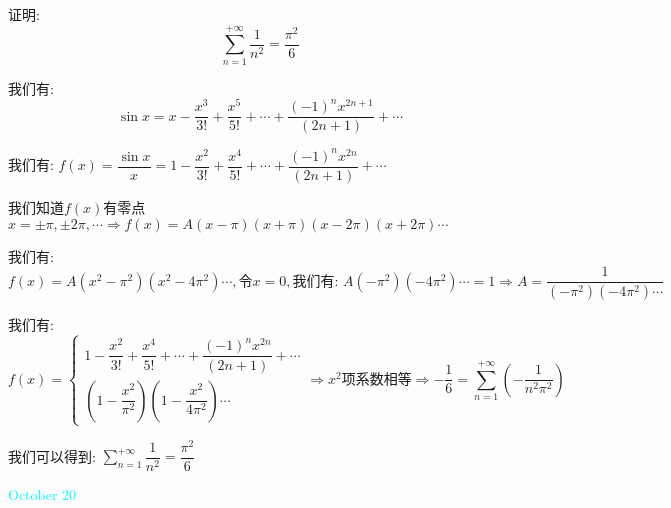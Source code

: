 \begin{example}[][Exam: 36.3.10]
	证明: $$\sum\limits_{n=1}^{+\infty}\dfrac{1}{n^2}=\dfrac{\pi^2}{6}$$
\end{example}

\begin{solution}

	我们有:  
	$$\sin x=x-\dfrac{x^3}{3!}+\dfrac{x^5}{5!}+\cdots+\dfrac{(-1)^{n}x^{2n+1}}{(2n+1)}+\cdots$$
	
	我们有:  $f(x)=\dfrac{\sin x}{x}=1-\dfrac{x^2}{3!}+\dfrac{x^4}{5!}+\cdots+\dfrac{(-1)^{n}x^{2n}}{(2n+1)}+\cdots$
	
	我们知道$f(x)$有零点$x=\pm\pi,\pm 2\pi,\cdots\Rightarrow f(x)=A(x-\pi)(x+\pi)(x-2\pi)(x+2\pi)\cdots$
	
	
	我们有:  
	$$f(x)=A(x^2-\pi^2)(x^2-4\pi^2)\cdots,\text{令}x=0,\text{我们有:  }A(-\pi^2)(-4\pi^2)\cdots=1\Rightarrow A=\dfrac{1}{(-\pi^2)(-4\pi^2)\cdots}$$
	
	我们有:  $$f(x)=\left\lbrace
	\begin{array}{l}
		1-\dfrac{x^2}{3!}+\dfrac{x^4}{5!}+\cdots+\dfrac{(-1)^{n}x^{2n}}{(2n+1)}+\cdots\\
		(1-\dfrac{x^2}{\pi^2})(1-\dfrac{x^2}{4\pi^2})\cdots
	\end{array}
	\right. \Rightarrow x^2\text{项系数相等}\Rightarrow -\dfrac{1}{6}=\sum\limits_{n=1}^{+\infty}(-\dfrac{1}{n^2\pi^2})$$
	
	我们可以得到:  $\sum\limits_{n=1}^{+\infty}\dfrac{1}{n^2}=\dfrac{\pi^2}{6}$
\end{solution}


\textcolor{cyan}{October 20}

